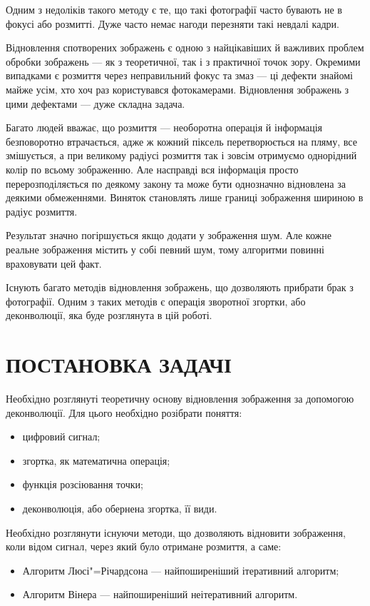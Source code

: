 \documentclass{diploma}
\begin{document}
  Одним з недоліків такого методу є те, що такі фотографії часто бувають
  не в фокусі або розмитті.
  Дуже часто немає нагоди перезняти такі невдалі кадри.

  Відновлення спотворених зображень є одною з найцікавіших й важливих проблем
  обробки зображень --- як з теоретичної, так і з практичної точок зору.
  Окремими випадками є розмиття через неправильний фокус та змаз --- ці
  дефекти знайомі майже усім, хто хоч раз користувався фотокамерами.
  Відновлення зображень з цими дефектами --- дуже складна задача.

  Багато людей вважає, що розмиття --- необоротна операція й інформація
  безповоротно втрачається, адже ж кожний піксель перетворюється на пляму, все
  змішується, а при великому радіусі розмиття так і зовсім отримуємо
  однорідний колір по всьому зображенню.
  Але насправді вся інформація просто перерозподіляється по деякому закону та
  може бути однозначно відновлена за деякими обмеженнями.
  Виняток становлять лише границі зображення шириною в радіус розмиття.

  Результат значно погіршується якщо додати у зображення шум.
  Але кожне реальне зображення містить у собі певний шум, тому алгоритми
  повинні враховувати цей факт.

  Існують багато методів відновлення зображень, що дозволяють прибрати брак з
  фотографії.
  Одним з таких методів є операція зворотної згортки, або
  деконволюції, яка буде розглянута в цій роботі.
  \clearpage
\chapter{ПОСТАНОВКА ЗАДАЧІ}
  Необхідно розглянуті теоретичну основу відновлення зображення за допомогою
  деконволюції.
  Для цього необхідно розібрати поняття:
  \begin{itemize}
    \item цифровий сигнал;
    \item згортка, як математична операція;
    \item функція розсіювання точки;
    \item деконволюція, або обернена згортка, її види.
  \end{itemize}

  Необхідно розглянути існуючи методи, що дозволяють відновити зображення,
  коли відом сигнал, через який було отримане розмиття, а саме:
  \begin{itemize}
    \item Алгоритм Люсі"=Річардсона --- найпоширеніший ітеративний алгоритм;
    \item Алгоритм Вінера --- найпоширеніший неітеративний алгоритм.
  \end{itemize}
  \clearpage
\end{document}
